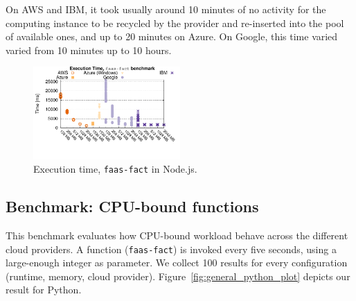 On \gls{AWS} and \gls{IBM}, it took usually around 10 minutes of no activity for the computing instance to be recycled by the provider and re-inserted into the pool of available ones, and up to 20 minutes on Azure. 
On Google, this time varied varied from 10 minutes up to 10 hours. %




\begin{figure}[!t]
\centering
\includegraphics[width=0.5\textwidth, trim={0 40 0 0}]{bilder/general_node/cpufact.pdf}
\caption{Execution time, \texttt{faas-fact} in Node.js.}
\label{fig:general_node_plot}
\end{figure}

\subsection{Benchmark: CPU-bound functions}
\label{sec:general_test}
This benchmark evaluates how CPU-bound workload behave across the different cloud providers.
A function (\texttt{faas-fact}) is invoked every five seconds, using a large-enough integer as parameter. 
We collect 100 results for every configuration (runtime, memory, cloud provider).
Figure~\ref{fig:general_python_plot} depicts our result for Python.


